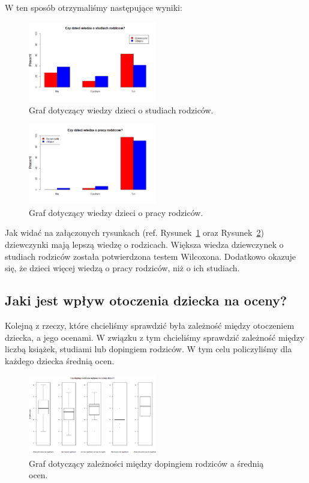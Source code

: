 \documentclass[conference]{IEEEtran}
\begin{document}
W ten sposób otrzymaliśmy następujące wyniki:

\begin{figure}
	\centering
	\includegraphics[width=0.5\textwidth]{1.png}
	\caption{Graf dotyczący wiedzy dzieci o studiach rodziców.}
	\label{fig:studies_knowledge}
\end{figure}
\begin{figure}
	\centering
	\includegraphics[width=0.5\textwidth]{2.png}
	\caption{Graf dotyczący wiedzy dzieci o pracy rodziców.}
	\label{fig:work_knowledge}
\end{figure}

Jak widać na załączonych rysunkach (ref. Rysunek~\ref{fig:studies_knowledge} oraz Rysunek~\ref{fig:work_knowledge}) dziewczynki mają lepszą wiedzę o rodzicach. Większa wiedza dziewczynek o studiach rodziców została potwierdzona testem Wilcoxona. Dodatkowo okazuje się, że dzieci więcej wiedzą o pracy rodziców, niż o ich studiach.

\subsection{Jaki jest wpływ otoczenia dziecka na oceny?}
Kolejną z rzeczy, które chcieliśmy sprawdzić była zależność między otoczeniem dziecka, a jego ocenami. W związku z tym chcieliśmy sprawdzić zależność między liczbą książek, studiami lub dopingiem rodziców. W tym celu policzyliśmy dla każdego dziecka średnią ocen.

\begin{figure}
	\centering
	\includegraphics[width=0.5\textwidth]{3.png}
	\caption{Graf dotyczący zależności między dopingiem rodziców a  średnią ocen.}
	\label{fig:doping_oceny}
\end{figure}
\end{document}
